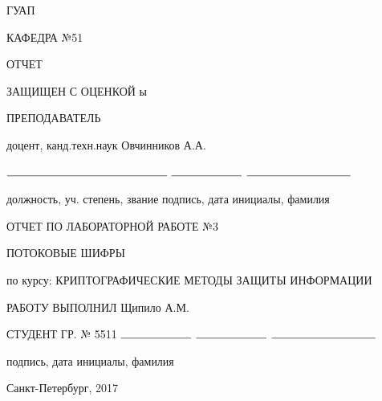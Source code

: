 \documentclass{article}
\begin{document}
\begin{titlepage}
	\begin{center}
    	ГУАП
    	\vspace{0.25cm}

    	КАФЕДРА №51
	\end{center}

    \begin{flushleft}

    	ОТЧЕТ

    	ЗАЩИЩЕН С ОЦЕНКОЙ
    	ы

		ПРЕПОДАВАТЕЛЬ


    	\vspace{0.5cm}
    	
    	доцент, канд.техн.наук \hspace{10.5cm} Овчинников А.А.

		$\rule{5cm}{0.15mm}$ \hfill $\rule{2.2cm}{0.15mm}$  \hfill $\rule{3.25cm}{0.15mm}$

		должность, уч. степень, звание \hfill подпись, дата \hfill инициалы, фамилия
    \end{flushleft}

 	
    \hspace{2cm}

	\begin{center}
    	ОТЧЕТ ПО ЛАБОРАТОРНОЙ РАБОТЕ №3


    	\vspace{1cm}

    	ПОТОКОВЫЕ ШИФРЫ


    	\vspace{1cm}

    	по курсу: КРИПТОГРАФИЧЕСКИЕ МЕТОДЫ ЗАЩИТЫ ИНФОРМАЦИИ
    \end{center}

    \vspace{3cm}

    \begin{flushleft}
    	РАБОТУ ВЫПОЛНИЛ \hspace{10.5cm} Щипило А.М.

    	СТУДЕНТ ГР. № 5511 \hspace{0.5cm} $\rule{2.2cm}{0.15mm}$  \hspace{2cm} $\rule{2.2cm}{0.15mm}$  \hfill $\rule{3.25cm}{0.15mm}$

    	\hspace{8.7cm} подпись, дата \hfill  инициалы, фамилия
    \end{flushleft}

	\vspace{5cm}
	\begin{center}
 		Санкт-Петербург, 2017
	\end{center}
\end{titlepage}
\end{document}

